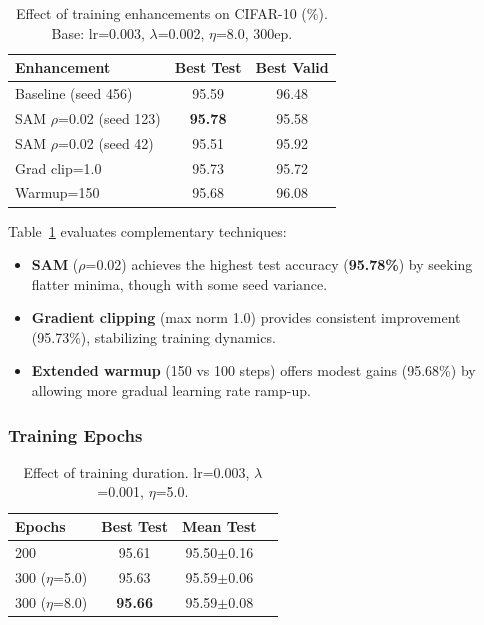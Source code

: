 \documentclass[10pt,twocolumn]{article}
\begin{document}
\begin{table}[ht]
\centering
\caption{Effect of training enhancements on CIFAR-10 (\%). Base: lr=0.003, $\lambda$=0.002, $\eta$=8.0, 300ep.}
\label{tab:ablation_enhance}
\begin{tabular}{@{}lcc@{}}
\toprule
\textbf{Enhancement} & \textbf{Best Test} & \textbf{Best Valid} \\
\midrule
Baseline (seed 456)        & 95.59 & 96.48 \\
SAM $\rho$=0.02 (seed 123) & \textbf{95.78} & 95.58 \\
SAM $\rho$=0.02 (seed 42)  & 95.51 & 95.92 \\
Grad clip=1.0              & 95.73 & 95.72 \\
Warmup=150                 & 95.68 & 96.08 \\
\bottomrule
\end{tabular}
\end{table}

Table~\ref{tab:ablation_enhance} evaluates complementary techniques:
\begin{itemize}
    \item \textbf{SAM} ($\rho$=0.02) achieves the highest test accuracy (\textbf{95.78\%}) by seeking flatter minima, though with some seed variance.
    \item \textbf{Gradient clipping} (max norm 1.0) provides consistent improvement (95.73\%), stabilizing training dynamics.
    \item \textbf{Extended warmup} (150 vs 100 steps) offers modest gains (95.68\%) by allowing more gradual learning rate ramp-up.
\end{itemize}

\subsubsection{Training Epochs}

\begin{table}[ht]
\centering
\caption{Effect of training duration. lr=0.003, $\lambda$=0.001, $\eta$=5.0.}
\label{tab:ablation_epochs}
\begin{tabular}{@{}lccc@{}}
\toprule
\textbf{Epochs} & \textbf{Best Test} & \textbf{Mean Test} \\
\midrule
200 & 95.61 & 95.50$\pm$0.16 \\
300 ($\eta$=5.0) & 95.63 & 95.59$\pm$0.06 \\
300 ($\eta$=8.0) & \textbf{95.66} & 95.59$\pm$0.08 \\
\bottomrule
\end{tabular}
\end{table}
\end{document}
